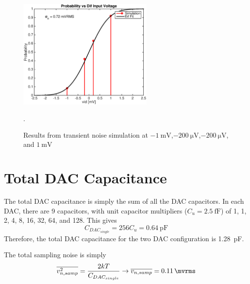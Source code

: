 \documentclass[letterpaper, notitlepage]{revtex4-1}
\begin{document}
\begin{figure}[h]
\begin{center}
\includegraphics[width=0.6\textwidth]{Part_G.eps}
\caption{Results from transient noise simulation at $\SI{-1}{\milli\volt}$,$\SI{-200}{\micro\volt}$,$\SI{-200}{\micro\volt}$, and $\SI{1}{\milli\volt}$}. 
\label{fig:TransientNoise}
\end{center}
\end{figure}
\section{Total DAC Capacitance}
The total DAC capacitance is simply the sum of all the DAC capacitors. In each DAC, there are 9 capacitors, with unit capacitor multipliers ($C_u=\SI{2.5}{\femto\farad}$) of 1, 1, 2, 4, 8, 16, 32, 64, and 128. This gives
\begin{equation}
C_{DAC_{single}}=256C_u=\SI{0.64}{\pico\farad}
\end{equation}
Therefore, the total DAC capacitance for the two DAC configuration is \SI{1.28}{\pico\farad}.

The total sampling noise is simply
\begin{equation}
\overline{v_{n,samp}^2}=\frac{2kT}{C_{DAC_{single}}}\rightarrow\overline{v_{n,samp}}=\SI{0.11}{\mvrms}
\end{equation}


\end{document}
